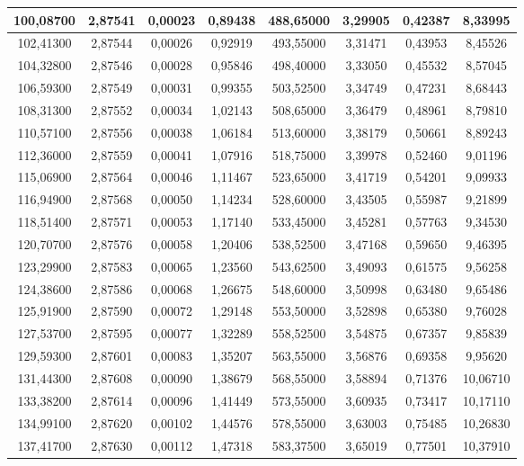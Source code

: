 \documentclass[a4paper,12pt]{article}
\numberwithin{equation}{section}
\begin{document}
\begin{appendices}
\begin{longtable}[c]{|c|c|c|c|c|c|c|c|}
100,08700	&	2,87541	&	0,00023	&	0,89438	&	488,65000	&	3,29905	&	0,42387	&	8,33995	\\\hline
102,41300	&	2,87544	&	0,00026	&	0,92919	&	493,55000	&	3,31471	&	0,43953	&	8,45526	\\\hline
104,32800	&	2,87546	&	0,00028	&	0,95846	&	498,40000	&	3,33050	&	0,45532	&	8,57045	\\\hline
106,59300	&	2,87549	&	0,00031	&	0,99355	&	503,52500	&	3,34749	&	0,47231	&	8,68443	\\\hline
108,31300	&	2,87552	&	0,00034	&	1,02143	&	508,65000	&	3,36479	&	0,48961	&	8,79810	\\\hline
110,57100	&	2,87556	&	0,00038	&	1,06184	&	513,60000	&	3,38179	&	0,50661	&	8,89243	\\\hline
112,36000	&	2,87559	&	0,00041	&	1,07916	&	518,75000	&	3,39978	&	0,52460	&	9,01196	\\\hline
115,06900	&	2,87564	&	0,00046	&	1,11467	&	523,65000	&	3,41719	&	0,54201	&	9,09933	\\\hline
116,94900	&	2,87568	&	0,00050	&	1,14234	&	528,60000	&	3,43505	&	0,55987	&	9,21899	\\\hline
118,51400	&	2,87571	&	0,00053	&	1,17140	&	533,45000	&	3,45281	&	0,57763	&	9,34530	\\\hline
120,70700	&	2,87576	&	0,00058	&	1,20406	&	538,52500	&	3,47168	&	0,59650	&	9,46395	\\\hline
123,29900	&	2,87583	&	0,00065	&	1,23560	&	543,62500	&	3,49093	&	0,61575	&	9,56258	\\\hline
124,38600	&	2,87586	&	0,00068	&	1,26675	&	548,60000	&	3,50998	&	0,63480	&	9,65486	\\\hline
125,91900	&	2,87590	&	0,00072	&	1,29148	&	553,50000	&	3,52898	&	0,65380	&	9,76028	\\\hline
127,53700	&	2,87595	&	0,00077	&	1,32289	&	558,52500	&	3,54875	&	0,67357	&	9,85839	\\\hline
129,59300	&	2,87601	&	0,00083	&	1,35207	&	563,55000	&	3,56876	&	0,69358	&	9,95620	\\\hline
131,44300	&	2,87608	&	0,00090	&	1,38679	&	568,55000	&	3,58894	&	0,71376	&	10,06710	\\\hline
133,38200	&	2,87614	&	0,00096	&	1,41449	&	573,55000	&	3,60935	&	0,73417	&	10,17110	\\\hline
134,99100	&	2,87620	&	0,00102	&	1,44576	&	578,55000	&	3,63003	&	0,75485	&	10,26830	\\\hline
137,41700	&	2,87630	&	0,00112	&	1,47318	&	583,37500	&	3,65019	&	0,77501	&	10,37910	\\\hline

\end{longtable}
\end{appendices}
\end{document}
